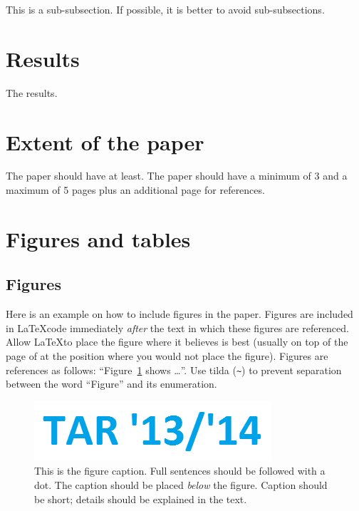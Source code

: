 \documentclass[10pt, a4paper]{article}
\begin{document}
This is a sub-subsection. If possible, it is better to avoid sub-subsections. 

\section{Results}
The results.

\section{Extent of the paper}

The paper should have at least. The paper should have a minimum of 3 and a maximum of 5 pages plus an additional page for references.

\section{Figures and tables}

\subsection{Figures}

Here is an example on how to include figures in the paper. Figures are included in \LaTeX code immediately \textit{after} the text in which these figures are referenced. Allow \LaTeX to place the figure where it believes is best (usually on top of the page of at the position where you would not place the figure). Figures are references as follows: ``Figure~\ref{fig:figure1} shows \dots''. Use tilda (\verb.~.) to prevent separation between the word ``Figure'' and its enumeration. 

\begin{figure}
\begin{center}
\includegraphics[width=\columnwidth]{tar1314}
\caption{This is the figure caption. Full sentences should be followed with a dot. The caption should be placed \textit{below} the figure. Caption should be short; details should be explained in the text.}
\label{fig:figure1}
\end{center}
\end{figure}
\end{document}
